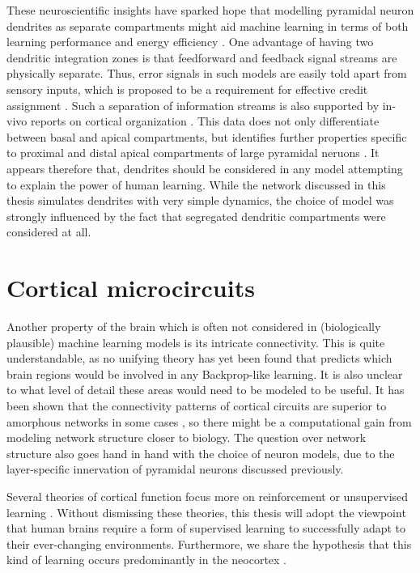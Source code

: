 These neuroscientific insights have  sparked hope that modelling pyramidal neuron dendrites as separate compartments
might aid machine learning in terms of both learning performance and energy efficiency
\citep{Chavlis2021,guerguiev2017towards,Richards2019,Eyal2018}. One advantage of having two dendritic integration zones
is that feedforward and feedback signal streams are physically separate. Thus, error signals in such models are easily
told apart from sensory inputs, which is proposed to be a requirement for effective credit assignment
\citep{Richards2019}. Such a separation of information streams is also supported by in-vivo reports on cortical
organization \citep{Gilbert2013,Larkum2009,Ishizuka1995}. This data does not only differentiate between basal and apical
compartments, but identifies further properties specific to proximal and distal apical compartments of large pyramidal
neruons \citep{Larkum2018}. It appears therefore that, dendrites should be considered in any model attempting to explain the power of human
learning. While the network discussed in this thesis simulates dendrites with very simple dynamics, the choice of model
was strongly influenced by the fact that segregated dendritic compartments were considered at all.




\section{Cortical microcircuits}

Another property of the brain which is often not considered in (biologically plausible) machine learning models is its
intricate connectivity. This is quite understandable, as no unifying theory has yet been found that predicts which brain
regions would be involved in any Backprop-like learning. It is also unclear to what level of detail these areas would
need to be modeled to be useful. It has been shown that the connectivity patterns of cortical circuits are superior to
amorphous networks in some cases \citep{haeusler2007statistical}, so there might be a computational gain from modeling
network structure closer to biology. The question over network structure also goes hand in hand with the choice of
neuron models, due to the layer-specific innervation of pyramidal neurons discussed previously. \newline


Several theories of cortical function focus more on reinforcement \citep{Legenstein2008} or unsupervised learning
\citep{George2009,hausler2017inhibitory}. Without dismissing these theories, this thesis will adopt the viewpoint that
human brains require a form of supervised learning to successfully adapt to their ever-changing environments.
Furthermore, we share the hypothesis that this kind of learning occurs predominantly in the neocortex
\citep{Marblestone2016}.


